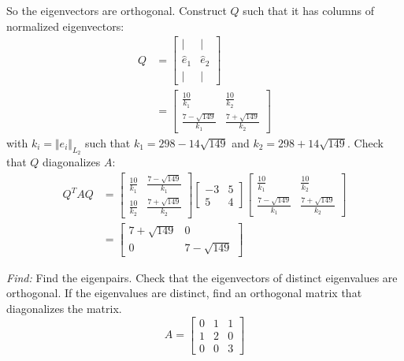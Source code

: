 \documentclass[11pt]{homework}
\begin{document}
So the eigenvectors are orthogonal.
Construct $Q$ such that it has
columns of normalized eigenvectors:
\begin{align*}
Q &= 
  \begin{bmatrix}
  | & | \\
  \hat e_1 & \hat e_2 \\
  | & | 
  \end{bmatrix}\\
  &=
  \begin{bmatrix}
  \frac{10}{k_1}             & \frac{10}{k_2} \\
  \frac{7 - \sqrt{149}}{k_1} & \frac{7 + \sqrt{149}}{k_2}
  \end{bmatrix}
\end{align*}
with $k_i = \Vert e_i \Vert_{L_2}$
such that $k_1 = 298 - 14 \sqrt{149}$ and
$k_2 = 298 + 14 \sqrt{149}$.
Check that $Q$ diagonalizes $A$:
\begin{align*}
Q^T A Q &=
  \begin{bmatrix}
    \frac{10}{k_1} &  \frac{7 - \sqrt{149}}{k_1} \\
    \frac{10}{k_2} &  \frac{7 + \sqrt{149}}{k_2}
  \end{bmatrix}
  \begin{bmatrix}
  -3 & 5 \\
  5 & 4
  \end{bmatrix}
  \begin{bmatrix}
  \frac{10}{k_1}             & \frac{10}{k_2} \\
  \frac{7 - \sqrt{149}}{k_1} & \frac{7 + \sqrt{149}}{k_2}
  \end{bmatrix} \\
  &=
  \begin{bmatrix}
  7 + \sqrt{149} & 0 \\
  0 & 7 - \sqrt{149}
  \end{bmatrix}
\end{align*}

\question
\emph{Find:}
\newline
Find the eigenpairs.
Check that the eigenvectors of distinct eigenvalues are orthogonal.
If the eigenvalues are distinct, find an orthogonal matrix that diagonalizes the matrix.
\begin{equation*}
A = 
  \begin{bmatrix}
  0 & 1 & 1 \\
  1 & 2 & 0 \\
  0 & 0 & 3
  \end{bmatrix}
\end{equation*}
\end{document}
